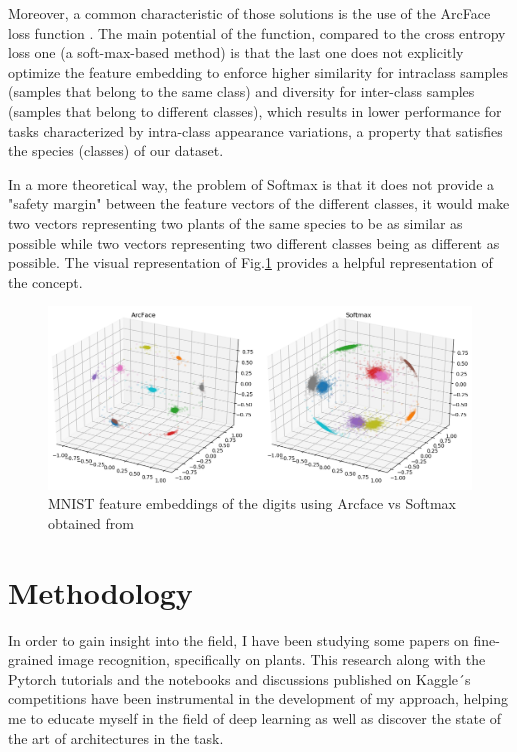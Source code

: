 \documentclass{article}
\begin{document}
Moreover, a common characteristic of those solutions is the use of the ArcFace loss function \cite{arcface}. The main potential of the function, compared to the cross entropy loss one (a soft-max-based method) is that the last one does not explicitly optimize the feature embedding to enforce higher similarity for intraclass samples (samples that belong to the same class) and diversity for inter-class samples (samples that belong to different classes), which results in lower performance for tasks characterized by intra-class appearance variations, a property that satisfies the species (classes) of our dataset. 

In a more theoretical way, the problem of Softmax is that it does not provide a "safety margin" between the feature vectors of the different classes, it would make two vectors representing two plants of the same species to be as similar as possible while two vectors representing two different classes being as different as possible. The visual representation of Fig.\ref{fig:arcface} provides a helpful representation of the concept.

\begin{figure}[h]
    \centering
    \includegraphics[width=13cm]{arcface}
    \caption{MNIST feature embeddings of the digits using Arcface vs Softmax obtained from }
    \label{fig:arcface}

\end{figure}


\section{Methodology}
In order to gain insight into the field, I have been studying some papers on fine-grained image recognition, specifically on plants. This research along with the Pytorch tutorials and the notebooks and discussions published on Kaggle´s competitions have been instrumental in the development of my approach, helping me to educate myself in the field of deep learning as well as discover the state of the art of architectures in the task.
\end{document}
